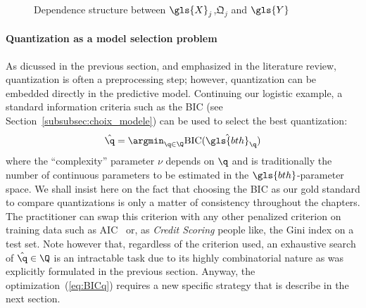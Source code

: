\begin{figure}[!ht]
\centering
\begin{minipage}{0.45\textwidth}
\centering
{}
\caption{\label{fig:dep}Dependence structure between $\gls{X}_j$,$\bm{\mathfrak{Q}}_j$ and $\gls{Y}$} 
\end{minipage}
\end{figure}

\paragraph{Quantization as a model selection problem} \label{par:model_selec}

As dicussed in the previous section, and emphasized in the literature review, quantization is often a preprocessing step; however, quantization can be embedded directly in the predictive model. Continuing our logistic example, a standard information criteria such as the BIC (see Section~\ref{subsubsec:choix_modele}) can be used to select the best quantization:
\begin{equation}
    \label{eq:BICq}
    \hat{\q}=\argmin_{\q \in \Q} \text{BIC}(\hat{\gls{bth}}_{\q})
\end{equation}
where the ``complexity'' parameter $\nu$ depends on ${\q}$ and is traditionally the number of continuous parameters to be estimated in the $\gls{bth}$-parameter space. We shall insist here on the fact that choosing the BIC as our gold standard to compare quantizations is only a matter of consistency throughout the chapters. The practitioner can swap this criterion with any other penalized criterion on training data such as AIC~\cite{akaike1973information} or, as \textit{Credit Scoring} people like, the Gini index on a test set. Note however that, regardless of the criterion used, an exhaustive search of $\hat{\q}\in\Q$ is an intractable task due to its highly combinatorial nature as was explicitly formulated in the previous section. Anyway, the optimization~(\ref{eq:BICq}) requires a new specific strategy that is describe in the next section.

